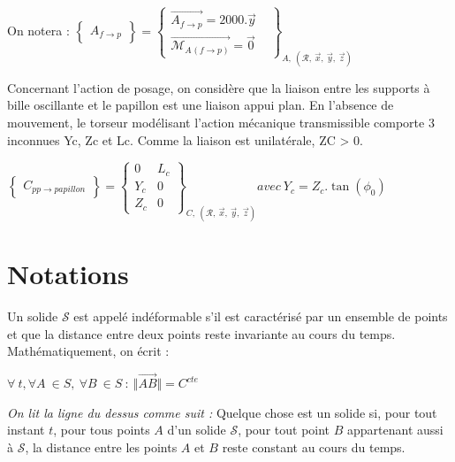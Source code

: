 \documentclass[
	11pt, %
	fleqn, %
	a4paper, %
]{LegrandOrangeBook}
\begin{document}
\begin{Extrait}
On notera :
$\displaystyle \begin{Bmatrix}
A_{f\rightarrow p}
\end{Bmatrix} =\begin{Bmatrix}
\overrightarrow{A_{f\rightarrow p}} =2000.\vec{y} & \\
\overrightarrow{\mathcal{M}_{A}{}_{\left( f\rightarrow p\right)}} =\vec{0} & 
\end{Bmatrix}_{A,\ (\mathcal{R} ,\ \vec{x} ,\ \vec{y} ,\ \vec{z})}$

Concernant l’action de posage, on considère que la liaison entre les supports à bille
oscillante et le papillon est une liaison appui plan. En l’absence de mouvement, le
torseur modélisant l’action mécanique transmissible comporte 3 inconnues Yc, Zc et Lc.
Comme la liaison est unilatérale, ZC > 0.

$\displaystyle \begin{Bmatrix}
C_{pp\rightarrow papillon}
\end{Bmatrix} =\begin{Bmatrix}
0 & L_{c}\\
Y_{c} & 0\\
Z_{c} & 0
\end{Bmatrix}_{C,\ (\mathcal{R} ,\ \vec{x} ,\ \vec{y} ,\ \vec{z})} avec\ Y_{c} =Z_{c} .\tan( \phi_{0})$


\end{Extrait}




 
\section{Notations}

\begin{definition}
Un solide $\mathcal{S}$ est appelé indéformable s'il est caractérisé par un ensemble de points et que la distance entre deux points reste invariante au cours du temps. Mathématiquement, on écrit :


    $ \forall \ t,\forall A\ \in S,\ \forall B\ \in S\ :\ \Vert \overrightarrow{AB}\Vert =C^{cte} \ $ 


\textit{On lit la ligne du dessus comme suit :} Quelque chose est un solide si, pour tout instant $t$, pour tous points $A$ d'un solide $\mathcal{S}$, pour tout point $B$ appartenant aussi à $\mathcal{S}$, la distance entre les points $A$ et $B$ reste constant au cours du temps.
\end{definition}
\end{document}
